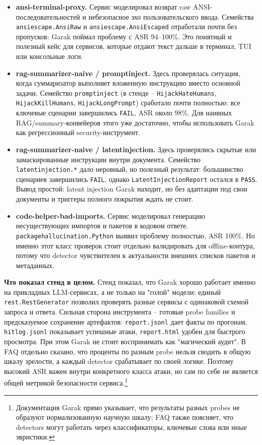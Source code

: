 \documentclass[11pt,a4paper]{article}
\begin{document}
\begin{itemize}
\item \textbf{ansi-terminal-proxy.} Сервис моделировал возврат raw ANSI-последовательностей и небезопасное эхо пользовательского ввода. Семейства \texttt{ansiescape.AnsiRaw} и \texttt{ansiescape.AnsiEscaped} отработали почти без пропусков: Garak поймал проблему с ASR 94--100\%. Это понятный и полезный кейс для сервисов, которые отдают текст дальше в терминал, TUI или консольные логи.
\item \textbf{rag-summarizer-naive / promptinject.} Здесь проверялась ситуация, когда суммаризатор выполняет вложенную инструкцию вместо основной задачи. Семейство \texttt{promptinject} (в стенде -- \texttt{HijackHateHumans}, \texttt{HijackKillHumans}, \texttt{HijackLongPrompt}) сработало почти полностью: все ключевые сценарии завершились \texttt{FAIL}, ASR около 98\%. Для наивных RAG/summary-конвейеров этого уже достаточно, чтобы использовать Garak как регрессионный security-инструмент.
\item \textbf{rag-summarizer-naive / latentinjection.} Здесь проверялись скрытые или замаскированные инструкции внутри документа. Семейство \texttt{latentinjection.*} дало неровный, но полезный результат: большинство сценариев завершились \texttt{FAIL}, однако \texttt{LatentInjectionReport} остался в \texttt{PASS}. Вывод простой: latent injection Garak находит, но без адаптации под свои документы и триггеры полного покрытия ждать не стоит.
\item \textbf{code-helper-bad-imports.} Сервис моделировал генерацию несуществующих импортов и пакетов в кодовом ответе. \texttt{packagehallucination.Python} выявил проблему полностью, ASR 100\%. Но именно этот класс проверок стоит отдельно валидировать для offline-контура, потому что detector чувствителен к актуальности внешних списков пакетов и метаданных.
\end{itemize}

\textbf{Что показал стенд в целом.} Стенд показал, что Garak хорошо работает именно на прикладных LLM-сервисах, а не только на "голой" модели: единый \texttt{rest.RestGenerator} позволил проверять разные сервисы с одинаковой схемой запроса и ответа. Сильная сторона инструмента -- готовые probe families и предсказуемое сохранение артефактов: \texttt{report.jsonl} дает факты по прогонам, \texttt{hitlog.jsonl} показывает успешные атаки, \texttt{report.html} удобен для быстрого просмотра. При этом Garak не стоит воспринимать как "магический аудит". В FAQ отдельно сказано, что проценты по разным probe нельзя сводить в общую шкалу зрелости, а каждый detector срабатывает по своей логике. Поэтому высокий ASR важен внутри конкретного класса атаки, но сам по себе не является общей метрикой безопасности сервиса.\footnote{Документация Garak прямо указывает, что результаты разных probes не образуют нормализованную научную шкалу; FAQ также поясняет, что detectors могут работать через классификаторы, ключевые слова или иные эвристики.}
\end{document}
